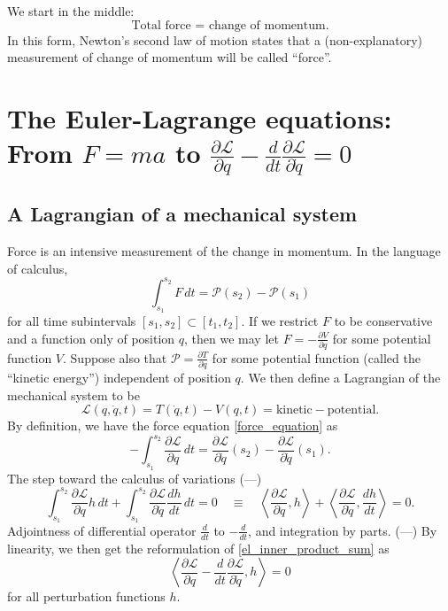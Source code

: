 \documentclass[11pt,a4paper]{memoir}
\newcommand{\fancyL}{\mathcal{L}}
\newcommand{\fancyP}{\mathcal{P}}
\newcommand{\Part}[2]{\frac{\partial #1}{\partial #2}}
\begin{document}

We start in the middle:
\begin{equation}
    \text{Total force = change of momentum}.
\end{equation}
In this form, Newton's second law of motion states that a (non-explanatory) measurement of change of momentum will be called ``force''.



\section{The Euler-Lagrange equations: \small{From $F = ma$ to $\Part{\fancyL}{q} - \frac{d}{dt}\Part{\fancyL}{\dot{q}} = 0$}} %
\subsection{A Lagrangian of a mechanical system}
Force is an intensive measurement of the change in momentum. In the language of calculus,
\begin{equation}\label{force_equation}
    \int_{s_1}^{s_2} F\,dt = \fancyP(s_2) - \fancyP(s_1)
\end{equation}
for all time subintervals $[s_1, s_2] \subset [t_1, t_2]$. If we restrict $F$ to be conservative and a function only of position $q$, then we may
let $F = -\Part{V}{q}$ for some potential function $V$. Suppose also that $\mathcal{P} = \Part{T}{\dot{q}}$ for some potential function
(called the ``kinetic energy'') independent
of position $q$. We then define a Lagrangian of the mechanical system to be
    $$\fancyL(q, \dot{q}, t) = T(\dot{q}, t) - V(q, t) = \text{kinetic} - \text{potential}.$$
By definition, we have the force equation \eqref{force_equation} as
    $$-\int_{s_1}^{s_2} \Part{\fancyL}{q}\,dt = \Part{\fancyL}{\dot{q}}(s_2) - \Part{\fancyL}{\dot{q}}(s_1).$$
The step toward the calculus of variations (---)
\begin{equation}\label{el_inner_product_sum}
        \int_{s_1}^{s_2} \Part{\fancyL}{q}h\,dt + \int_{s_1}^{s_2} \Part{\fancyL}{\dot{q}}\frac{dh}{dt}\,dt = 0
    \quad\equiv\quad    \left<\Part{\fancyL}{q}, h\right> + \left<\Part{\fancyL}{\dot{q}}, \frac{dh}{dt}\right> = 0.
\end{equation}
Adjointness of differential operator $\frac{d}{dt}$ to $-\frac{d}{dt}$, and integration by parts. (---)
By linearity, we then get the reformulation of \eqref{el_inner_product_sum} as
\newcommand{\gateauxlagrangian}{\Part{\fancyL}{q} - \frac{d}{dt}\Part{\fancyL}{\dot{q}}}
    $$\left<\gateauxlagrangian, h\right> = 0$$
for all perturbation functions $h$.
\end{document}
